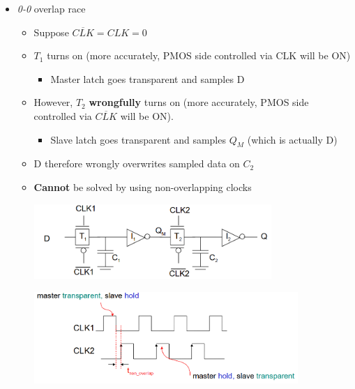 \documentclass{article}
\begin{document}
\begin{itemize}
    \item \textit{0-0} overlap race
        \begin{itemize}
            \item Suppose $\overline{CLK} = CLK = 0$
            \item $T_{1}$ turns on (more accurately, PMOS side controlled via CLK will be ON)
                \begin{itemize}
                    \item Master latch goes transparent and samples D
                \end{itemize}
            \item However, $T_{2}$ \textbf{wrongfully} turns on (more accurately, PMOS side controlled via $\overline{CLK}$ will be ON). 
                \begin{itemize}
                    \item Slave latch goes transparent and samples $Q_{M}$ (which is actually D)
                \end{itemize}
            \item D therefore wrongly overwrites sampled data on $C_{2}$
            
            \newpage
            \item \textbf{Cannot} be solved by using non-overlapping clocks

                \begin{minipage}[t]{0.4\textwidth}
                    \centering
                    \includegraphics[width=9cm, scale=1]{nonOverlap_fail1.PNG}
                    \captionsetup{justification=centering}
                \end{minipage}%
                \begin{minipage}[t]{0.6\textwidth}
                    \centering
                    \includegraphics[width=10cm, scale=1]{nonOverlap_fail2.PNG}
                    \captionsetup{justification=centering}
                \end{minipage}%


\end{itemize}
\end{itemize}
\end{document}

